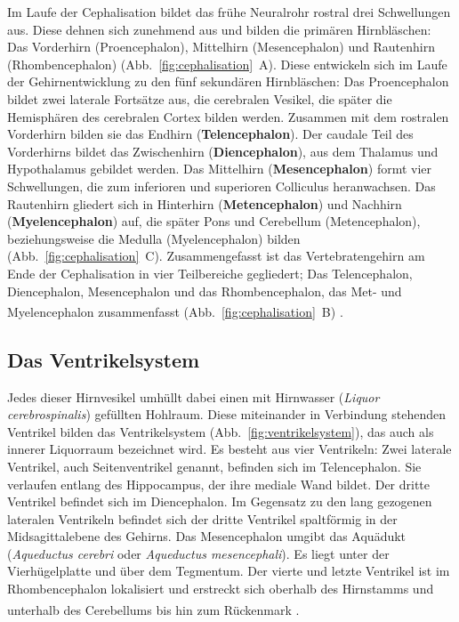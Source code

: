 \documentclass[12pt,a4paper,pdftex]{article}
\begin{document}
\noindent Im Laufe der Cephalisation bildet das frühe Neuralrohr rostral drei Schwellungen aus. Diese dehnen sich zunehmend aus und bilden die primären Hirnbläschen: Das Vorderhirn (Proencephalon), Mittelhirn (Mesencephalon) und Rautenhirn (Rhombencephalon) (Abb.~\ref{fig:cephalisation}~A). Diese entwickeln sich im Laufe der Gehirnentwicklung zu den fünf sekundären Hirnbläschen: Das Proencephalon bildet zwei laterale Fortsätze aus, die cerebralen Vesikel, die später die Hemisphären des cerebralen Cortex bilden werden. Zusammen mit dem rostralen Vorderhirn bilden sie das Endhirn (\textbf{Telencephalon}). Der caudale Teil des Vorderhirns bildet das Zwischenhirn (\textbf{Diencephalon}), aus dem Thalamus und Hypothalamus gebildet werden. Das Mittelhirn (\textbf{Mesencephalon}) formt vier Schwellungen, die zum inferioren und superioren Colliculus heranwachsen. Das Rautenhirn gliedert sich in Hinterhirn (\textbf{Metencephalon}) und Nachhirn (\textbf{Myelencephalon}) auf, die später Pons und Cerebellum (Metencephalon), beziehungsweise die Medulla (Myelencephalon) bilden (Abb.~\ref{fig:cephalisation}~C). Zusammengefasst ist das Vertebratengehirn am Ende der Cephalisation in vier Teilbereiche gegliedert; Das Telencephalon, Diencephalon, Mesencephalon und das Rhombencephalon, das Met- und Myelencephalon zusammenfasst (Abb.~\ref{fig:cephalisation}~B) \textsuperscript{\cite[10]{watson2010thebrain}}.

\subsection{Das Ventrikelsystem}
\label{subsec:} 

Jedes dieser Hirnvesikel umhüllt dabei einen mit Hirnwasser (\textit{Liquor cerebrospinalis}) gefüllten Hohlraum. Diese miteinander in Verbindung stehenden Ventrikel bilden das Ventrikelsystem (Abb.~\ref{fig:ventrikelsystem}), das auch als innerer Liquorraum  bezeichnet wird. Es besteht aus vier Ventrikeln: Zwei laterale Ventrikel, auch Seitenventrikel genannt, befinden sich im Telencephalon. Sie verlaufen entlang des Hippocampus, der ihre mediale Wand bildet. Der dritte Ventrikel befindet sich im Diencephalon. Im Gegensatz zu den lang gezogenen lateralen Ventrikeln befindet sich der dritte Ventrikel spaltförmig in der Midsagittalebene des Gehirns. Das Mesencephalon umgibt das Aquädukt (\textit{Aqueductus cerebri} oder \textit{Aqueductus mesencephali}). Es liegt unter der Vierhügelplatte und über dem Tegmentum. Der vierte und letzte Ventrikel ist im Rhombencephalon lokalisiert und erstreckt sich oberhalb des Hirnstamms und unterhalb des Cerebellums bis hin zum Rückenmark
\textsuperscript{\cite[2]{watson2010thebrain}}.
\end{document}
